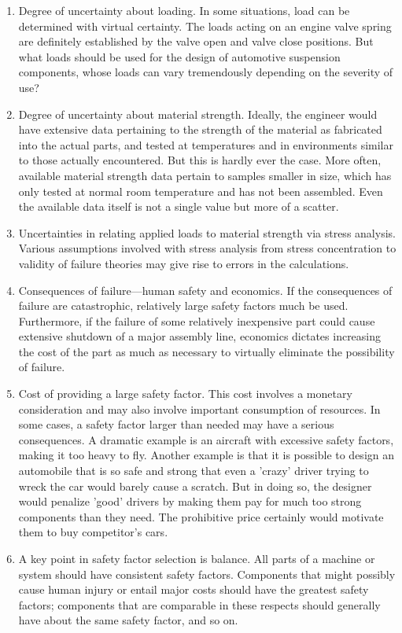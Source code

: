 \documentclass[a4paper,openany,nobib]{tufte-book}
\begin{document}
\begin{enumerate}
\item Degree of uncertainty about loading. In some situations, load can be
determined with virtual certainty. The loads acting on an engine
valve spring are definitely established by the valve open and valve
close positions. But what loads should be used for the design of
automotive suspension components, whose loads can vary tremendously
depending on the severity of use?

\item Degree of uncertainty about material strength. Ideally, the engineer
would have extensive data pertaining to the strength of the material
as fabricated into the actual parts, and tested at temperatures and
in environments similar to those actually encountered. But this is
hardly ever the case. More often, available material strength data
pertain to samples smaller in size, which has only tested at normal
room temperature and has not been assembled. Even the available data
itself is not a single value but more of a scatter.

\item Uncertainties in relating applied loads to material strength via
stress analysis. Various assumptions involved with stress analysis
from stress concentration to validity of failure theories may give
rise to errors in the calculations.

\item Consequences of failure---human safety and economics. If the
consequences of failure are catastrophic, relatively large safety
factors much be used. Furthermore, if the failure of some relatively
inexpensive part could cause extensive shutdown of a major assembly
line, economics dictates increasing the cost of the part as much as
necessary to virtually eliminate the possibility of failure.

\item Cost of providing a large safety factor. This cost involves a
monetary consideration and may also involve important consumption of
resources. In some cases, a safety factor larger than needed may have
a serious consequences. A dramatic example is an aircraft with
excessive safety factors, making it too heavy to fly. Another example
is that it is possible to design an automobile that is so safe and
strong that even a 'crazy' driver trying to wreck the car would
barely cause a scratch. But in doing so, the designer would penalize
'good' drivers by making them pay for much too strong components than
they need. The prohibitive price certainly would motivate them to buy
competitor's cars.

\item A key point in safety factor selection is balance. All parts of a
machine or system should have consistent safety factors. Components
that might possibly cause human injury or entail major costs should
have the greatest safety factors; components that are comparable in
these respects should generally have about the same safety factor,
and so on.
\end{enumerate}
\end{document}
